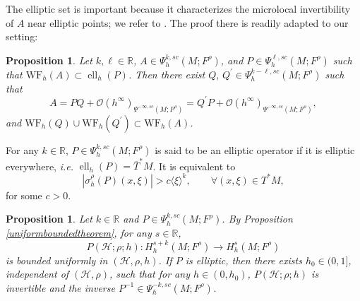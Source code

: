 \documentclass[11pt,oneside,reqno]{amsart}
\newcommand\R{\ensuremath{\mathbb{R}}}
\newtheorem{proposition}[theorem]{Proposition}
\theoremstyle{definition}
\numberwithin{equation}{section}
\theoremstyle{plain}
\begin{document}
The elliptic set is important because it characterizes the microlocal invertibility of $A$ near elliptic points; we refer to \cite[Proposition E.32]{dyatlovzworski2019resonances}. The proof there is readily adapted to our setting:

\begin{proposition}\label{prop:microelliptic}
Let $k,\ell \in \R$, $A \in \Psi_h^{k,sc}(M;F^\rho)$, and $P \in \Psi_h^{\ell,sc}(M;F^\rho)$ such that $\mathrm{WF}_h(A) \subset \operatorname{ell}_h(P)$. Then there exist $Q, \,Q^{\prime} \in \Psi_h^{k-\ell,sc}(M;F^\rho)$ such that
\begin{equation}\label{ellipticparametrix}
A=PQ+\mathcal{O}(h^{\infty})_{\Psi^{-\infty,sc}(M;F^\rho)}=Q^{\prime}P+\mathcal{O}(h^{\infty})_{\Psi^{-\infty,sc}(M;F^\rho)},
\end{equation}
and $\mathrm{WF}_h(Q) \cup \mathrm{WF}_h (Q^{\prime} ) \subset \mathrm{WF}_h(A)$.
\end{proposition}



For any $k\in \R$, $P \in \Psi_{h}^{k,sc}(M;F^\rho)$ is said to be an elliptic operator if it is elliptic everywhere, \emph{i.e.} $\operatorname{ell}_h(P)=\overline{T}^*M$. It is equivalent to 
\begin{equation}
|\sigma_{h}^{\rho}(P)(x,\xi)| > c\langle \xi \rangle^{k}, \qquad \forall (x,\xi) \in T^*M, 
\end{equation}
for some $c>0$. 

\begin{proposition}\label{inverseofelliptic}
Let $k\in \R$ and $P \in \Psi_{h}^{k,sc}(M;F^\rho)$. By Proposition \ref{uniformboundedtheorem}, for any $s\in \R$,
\begin{equation*}
    P(\mathcal{H};\rho;h):H^{s+k}_h(M;F^\rho) \rightarrow H^{s}_h(M;F^\rho) 
\end{equation*}
is bounded uniformly in $(\mathcal{H},\rho,h)$. If $P$ is elliptic, then there exists $h_0\in (0,1]$, independent of $(\mathcal{H},\rho)$, such that for any $h\in (0,h_0)$, 
$P(\mathcal{H};\rho;h)$ is invertible and the inverse
 $P^{-1} \in \Psi_{h}^{-k,sc}(M;F^\rho)$.
\end{proposition}
\end{document}
